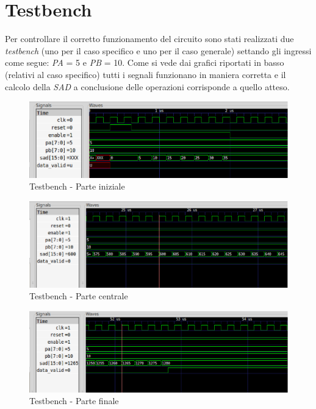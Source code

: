 \documentclass[12pt, a4paper]{article}
\begin{document}
\section{Testbench}
Per controllare il corretto funzionamento del circuito sono stati realizzati due \textit{testbench} (uno per il caso specifico e uno per il caso generale) settando gli ingressi come segue: \textit{PA} = 5 e \textit{PB} = 10. Come si vede dai grafici riportati in basso (relativi al caso specifico) tutti i segnali funzionano in maniera corretta e il calcolo della \textit{SAD} a conclusione delle operazioni corrisponde a quello atteso.
\begin{figure}[h!]
\centering
\includegraphics[scale=0.45]{images/tb1.eps}
\caption{Testbench - Parte iniziale}\label{fig:8}
\end{figure}
\begin{figure}[h!]
\centering
\includegraphics[scale=0.4]{images/tb2.eps}
\caption{Testbench - Parte centrale}\label{fig:9}
\end{figure}
\begin{figure}[h!]
\centering
\includegraphics[scale=0.45]{images/tb3.eps}
\caption{Testbench - Parte finale}\label{fig:10}
\end{figure}
\newpage
\end{document}
